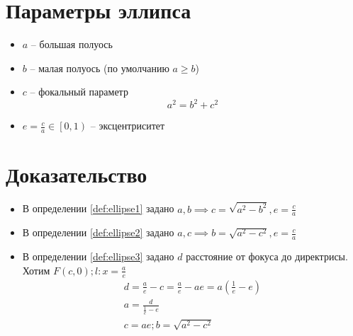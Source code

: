 \documentclass[main]{subfiles}
\begin{document}
\section*{Параметры эллипса}
\begin{itemize}
    \item $a$ -- большая полуось
    \item $b$ -- малая полуось (по умолчанию $a \ge b$)
    \item $c$ -- фокальный параметр \[a^2 = b^2 + c^2\]
    \item $e = \frac{c}{a} \in \left[0, 1\right)$ -- эксцентриситет
\end{itemize}

\section*{Доказательство}
\begin{itemize}
    \item В определении \ref{def:ellipse1} задано $a,b \implies c = \sqrt{a^2 -b^2}, e = \frac{c}{a}$
    \item В определении \ref{def:ellipse2} задано $a,c \implies b = \sqrt{a^2 -c^2}, e = \frac{c}{a}$
    \item В определении \ref{def:ellipse3} задано $d$ расстояние от фокуса до директрисы. Хотим $F(c,0);l:x = \frac{a}{e}$
          \begin{gather*}
              d = \frac{a}{e} -c = \frac{a}{e} - ae = a \left(\frac{1}{e}-e\right)\\
              a = \frac{d}{\frac{1}{e}-e}\\
              c=ae; b = \sqrt{a^2 -c^2}
          \end{gather*}
\end{itemize}
\end{document}
